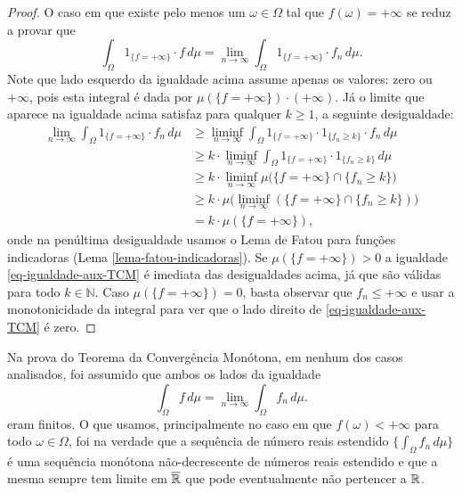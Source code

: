 \begin{proof}
O caso em que existe pelo menos um $\omega\in\Omega$ tal que 
$f(\omega)=+\infty$ se reduz a provar que 
\begin{equation}
\label{eq-igualdade-aux-TCM}
\int_{\Omega} 1_{\{f=+\infty\}}\cdot f\, d\mu
=
\lim_{n\to\infty}
\int_{\Omega} 1_{\{f=+\infty\}}\cdot f_n\, d\mu.
\end{equation}
Note que lado esquerdo da igualdade acima assume apenas 
os valores: zero ou $+\infty$, pois esta integral é dada por
$\mu(\{f=+\infty\})\cdot (+\infty)$. Já o limite que aparece na
igualdade acima satisfaz para qualquer $k\geq 1$, a seguinte 
desigualdade:
\begin{align*}
\lim_{n\to\infty}
\int_{\Omega} 1_{\{f=+\infty\}}\cdot f_n\, d\mu
&\geq 
\liminf_{n\to\infty}
\int_{\Omega} 1_{\{f=+\infty\}}\cdot 1_{\{f_n\geq k\}}\cdot f_n\, d\mu
\\
&\geq 
k\cdot
\liminf_{n\to\infty}
\int_{\Omega} 1_{\{f=+\infty\}}\cdot 1_{\{f_n\geq k\}}\, d\mu
\\
&\geq 
k\cdot
\liminf_{n\to\infty}
\mu\big( \{f=+\infty\}\cap \{f_n\geq k\} \big)
\\
&\geq 
k\cdot
\mu\Big(\liminf_{n\to\infty} (\{f=+\infty\}\cap \{f_n\geq k\}) \Big)
\\
&= 
k\cdot
\mu(\{f=+\infty\}),
\end{align*}
onde na penúltima desigualdade usamos o 
Lema de Fatou para funções indicadoras 
(Lema \ref{lema-fatou-indicadoras}).
Se $\mu(\{f=+\infty\})>0$
a igualdade \eqref{eq-igualdade-aux-TCM} é 
imediata das desigualdades acima, já que são 
válidas para todo $k\in\mathbb{N}$.
Caso $\mu(\{f=+\infty\})=0$, basta observar
que $f_n\leq +\infty$ e usar a monotonicidade
da integral para ver que o lado 
direito de \eqref{eq-igualdade-aux-TCM} é zero.
\end{proof}


\begin{observacao}
Na prova do Teorema da Convergência Monótona, em nenhum 
dos casos analisados, foi assumido que ambos os lados da igualdade 
\[
		\int_{\Omega} f\, d\mu
		=
		\lim_{n\to\infty} \int_{\Omega} f_n\, d\mu.
\]
eram finitos. O que usamos, principalmente no caso 
em que $f(\omega)<+\infty$ para todo $\omega\in\Omega$,
foi na verdade que a 
sequência de número reais estendido 
$\{\int_{\Omega} f_n\, d\mu\}$ é uma sequência 
monótona não-decrescente de números reais estendido
e que a mesma sempre tem limite em $\overline{\mathbb{R}}$ 
que pode eventualmente não pertencer a $\mathbb{R}$.
\end{observacao}






